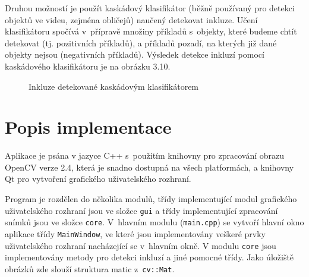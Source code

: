 \documentclass[12pt, a4paper]{report}
\begin{document}
Druhou možností je použít kaskádový klasifikátor (běžně používaný pro detekci objektů ve videu, zejména obličejů) naučený detekovat inkluze. Učení klasifikátoru spočívá v~přípravě množiny příkladů s~objekty, které budeme chtít detekovat (tj. pozitivních příkladů), a příkladů pozadí, na kterých již dané objekty nejsou (negativních příkladů). Výsledek detekce inkluzí pomocí kaskádového klasifikátoru je na obrázku 3.10.

\begin{figure}[!htb]
	\centering
	\label{fig:klasifikator}
	\caption{Inkluze detekované kaskádovým klasifikátorem}
	\end{figure}

\chapter{Popis implementace}
Aplikace je psána v jazyce C++ s~použitím knihovny pro zpracování obrazu OpenCV verze 2.4, která je snadno dostupná na všech platformách, a knihovny Qt pro vytvoření grafického uživatelského rozhraní.
	
	Program je rozdělen do několika modulů, třídy implementující modul grafického uživatelského rozhraní jsou ve složce \texttt{gui} a třídy implementující zpracování snímků jsou ve složce \texttt{core}. V~hlavním modulu (\texttt{main.cpp}) se vytvoří hlavní okno aplikace třídy \texttt{MainWindow}, ve které jsou implementovány veškeré prvky uživatelského rozhraní nacházející se v~hlavním okně. 
	V modulu \texttt{core} jsou implementovány metody pro detekci inkluzí a jiné pomocné třídy. Jako úložiště obrázků zde slouží struktura matic z~\OpenCV \texttt{cv::Mat}.
\end{document}
